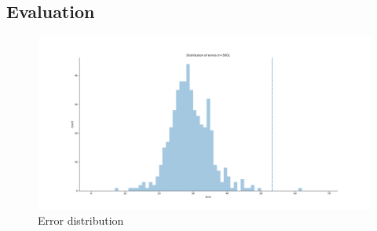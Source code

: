 \subsection{Evaluation}



    
    


\begin{figure}
    \centering
    \includegraphics[width=\linewidth]{imgs_andy/error_distribution_test_set_ensemble_simetrized.png}
    \caption{Error distribution}
    \label{fig:error_dist}
\end{figure}

